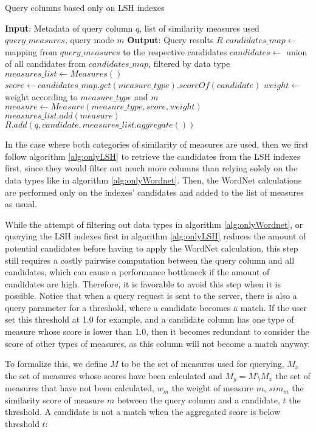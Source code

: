 \begin{algorithm}
    \caption{Query columns based only on LSH indexes}
    \label{alg:onlyLSH}
    \begin{algorithmic}[1]
\STATE \textbf{Input}: Metadata of query column $q$, list of similarity measures used $query\_measures$, query mode $m$
\STATE \textbf{Output}: Query results $R$
\STATE $candidates\_map \gets$ mapping from $query\_measures$ to the respective candidates
\STATE $candidates \gets$ union of all candidates from $candidates\_map$, filtered by data type
\STATE $measures\_list \gets Measures()$
\STATE $score \gets candidates\_map.get(measure\_type).scoreOf(candidate)$
\STATE $weight \gets$ weight according to $measure\_type$ and $m$
\STATE $measure \gets Measure(measure\_type, score, weight)$
\STATE $measures\_list.add(measure)$
\ENDFOR
\STATE $R.add(q, candidate, measures\_list.aggregate())$
\ENDFOR
    \end{algorithmic}
\end{algorithm}

In the case where both categories of similarity of measures are used, then we first follow algorithm \ref{alg:onlyLSH} to retrieve the candidates from the LSH indexes first, since they would filter out much more columns than relying solely on the data types like in algorithm \ref{alg:onlyWordnet}. Then, the WordNet calculations are performed only on the indexes' candidates and added to the list of measures as usual.

While the attempt of filtering out data types in algorithm \ref{alg:onlyWordnet}, or querying the LSH indexes first in algorithm \ref{alg:onlyLSH} reduces the amount of potential candidates before having to apply the WordNet calculation, this step still requires a costly pairwise computation between the query column and all candidates, which can cause a performance bottleneck if the amount of candidates are high. Therefore, it is favorable to avoid this step when it is possible. Notice that when a query request is sent to the server, there is also a query parameter for a threshold, where a candidate becomes a match. If the user set this threshold at 1.0 for example, and a candidate column has one type of measure whose score is lower than 1.0, then it becomes redundant to consider the score of other types of measures, as this column will not become a match anyway.

To formalize this, we define $M$ to be the set of measures used for querying, $M_x$ the set of measures whose scores have been calculated and $M_y = M \setminus M_x$ the set of measures that have not been calculated, $w_m$ the weight of measure $m$, $sim_m$ the similarity score of measure $m$ between the query column and a candidate, $t$ the threshold. A candidate is not a match when the aggregated score is below threshold $t$:

